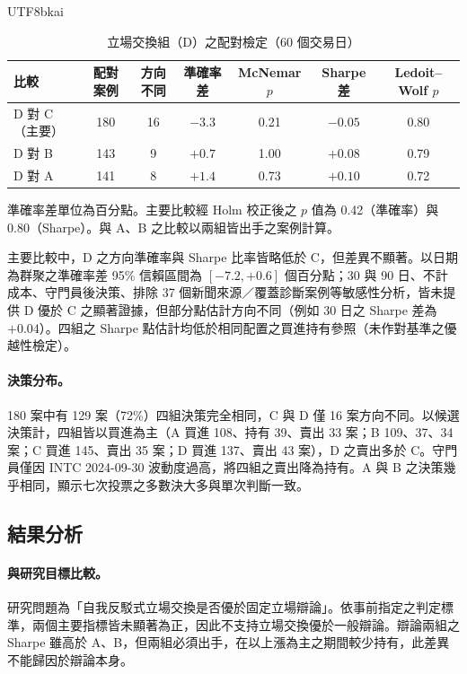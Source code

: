 \documentclass[12pt,a4paper]{article}
\newcommand{\grp}[1]{\textsf{#1}}
\begin{document}
\begin{CJK}{UTF8}{bkai}
\begin{table}[H]
\centering\small
\caption{立場交換組（\grp{D}）之配對檢定（60 個交易日）}
\label{tab:tests}
\begin{tabular}{@{}lcccccc@{}}
\toprule
比較 & 配對案例 & 方向不同 & 準確率差 & McNemar $p$ & Sharpe 差 & Ledoit--Wolf $p$ \\
\midrule
\grp{D} 對 \grp{C}（主要） & 180 & 16 & $-3.3$ & 0.21 & $-0.05$ & 0.80 \\
\grp{D} 對 \grp{B} & 143 & 9 & $+0.7$ & 1.00 & $+0.08$ & 0.79 \\
\grp{D} 對 \grp{A} & 141 & 8 & $+1.4$ & 0.73 & $+0.10$ & 0.72 \\
\bottomrule
\end{tabular}
\par\smallskip
\raggedright\footnotesize 準確率差單位為百分點。主要比較經 Holm 校正後之 $p$ 值為 0.42（準確率）與 0.80（Sharpe）。與 \grp{A}、\grp{B} 之比較以兩組皆出手之案例計算。
\end{table}

主要比較中，\grp{D} 之方向準確率與 Sharpe 比率皆略低於 \grp{C}，但差異不顯著。以日期為群聚之準確率差 95\% 信賴區間為 $[-7.2, +0.6]$ 個百分點；30 與 90 日、不計成本、守門員後決策、排除 37 個新聞來源／覆蓋診斷案例等敏感性分析，皆未提供 \grp{D} 優於 \grp{C} 之顯著證據，但部分點估計方向不同（例如 30 日之 Sharpe 差為 $+0.04$）。四組之 Sharpe 點估計均低於相同配置之買進持有參照（未作對基準之優越性檢定）。

\paragraph{決策分布。} 180 案中有 129 案（72\%）四組決策完全相同，\grp{C} 與 \grp{D} 僅 16 案方向不同。以候選決策計，四組皆以買進為主（\grp{A} 買進 108、持有 39、賣出 33 案；\grp{B} 109、37、34 案；\grp{C} 買進 145、賣出 35 案；\grp{D} 買進 137、賣出 43 案），\grp{D} 之賣出多於 \grp{C}。守門員僅因 INTC 2024-09-30 波動度過高，將四組之賣出降為持有。\grp{A} 與 \grp{B} 之決策幾乎相同，顯示七次投票之多數決大多與單次判斷一致。

\subsection{結果分析}

\paragraph{與研究目標比較。} 研究問題為「自我反駁式立場交換是否優於固定立場辯論」。依事前指定之判定標準，兩個主要指標皆未顯著為正，因此不支持立場交換優於一般辯論。辯論兩組之 Sharpe 雖高於 \grp{A}、\grp{B}，但兩組必須出手，在以上漲為主之期間較少持有，此差異不能歸因於辯論本身。


\end{CJK}
\end{document}

